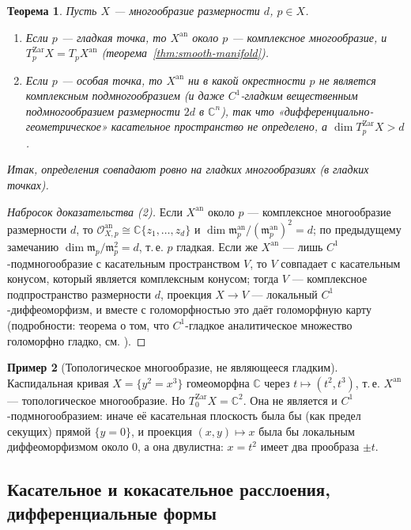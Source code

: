 \documentclass[11pt,a4paper]{article}
\theoremstyle{plain}
\newtheorem{theorem}{Теорема}[section]
\theoremstyle{definition}
\newtheorem{example}[theorem]{Пример}
\theoremstyle{remark}
\renewcommand{\C}{\mathbb{C}}
\newcommand{\cO}{\mathcal{O}}
\newcommand{\mm}{\mathfrak{m}}
\newcommand{\an}{\mathrm{an}}
\newcommand{\Zar}{\mathrm{Zar}}
\begin{document}
\begin{theorem}\label{thm:tangent-coincide}
Пусть $X$ --- многообразие размерности $d$, $p\in X$.
\begin{enumerate}
\item Если $p$ --- гладкая точка, то $X^{\an}$ около $p$ --- комплексное многообразие, и
$T^{\Zar}_pX=T_pX^{\an}$ (теорема~\ref{thm:smooth-manifold}).
\item Если $p$ --- особая точка, то $X^{\an}$ ни в какой окрестности $p$ не является комплексным
подмногообразием (и даже $C^1$-гладким вещественным подмногообразием размерности $2d$ в
$\C^n$), так что «дифференциально-геометрическое» касательное пространство не определено, а
$\dim T^{\Zar}_pX>d$.
\end{enumerate}
Итак, определения совпадают ровно на гладких многообразиях (в гладких точках).
\end{theorem}
\begin{proof}[Набросок доказательства (2)]
Если $X^{\an}$ около $p$ --- комплексное многообразие размерности $d$, то
$\cO^{\an}_{X,p}\cong\C\{z_1,\dots,z_d\}$ и $\dim\mm^{\an}_p/(\mm^\an_p)^2=d$; по предыдущему
замечанию $\dim\mm_p/\mm_p^2=d$, т.\,е. $p$ гладкая. Если же $X^{\an}$ --- лишь $C^1$-подмногообразие
с касательным пространством $V$, то $V$ совпадает с касательным конусом, который является
комплексным конусом; тогда $V$ --- комплексное подпространство размерности $d$, проекция
$X\to V$ --- локальный $C^1$-диффеоморфизм, и вместе с голоморфностью это даёт голоморфную карту
(подробности: теорема о том, что $C^1$-гладкое аналитическое множество голоморфно гладко, см.
\cite[гл.~1]{GH}).
\end{proof}

\begin{example}[Топологическое многообразие, не являющееся гладким]
Каспидальная кривая $X=\{y^2=x^3\}$ гомеоморфна $\C$ через $t\mapsto(t^2,t^3)$, т.\,е. $X^{\an}$
--- топологическое многообразие. Но $T^{\Zar}_0X=\C^2$. Она не является и $C^1$-подмногообразием:
иначе её касательная плоскость была бы (как предел секущих) прямой $\{y=0\}$, и проекция
$(x,y)\mapsto x$ была бы локальным диффеоморфизмом около $0$, а она двулистна:
$x=t^2$ имеет два прообраза $\pm t$.
\end{example}

\subsection{Касательное и кокасательное расслоения, дифференциальные формы}\label{ss:forms}
\end{document}
